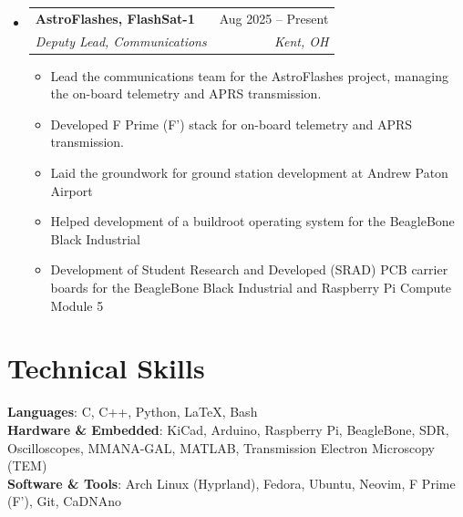 \documentclass[11pt, letterpaper]{article}
\makeatletter
\newcommand{\resumeItem}[1]{\item\small{#1}}
\newcommand{\resumeSubheading}[4]{
  \vspace{-1pt}\item
    \begin{tabular*}{0.97\textwidth}[t]{l@{\extracolsep{\fill}}r}
      \textbf{#1} & #2 \\
      \textit{\small#3} & \textit{\small #4} \\
    \end{tabular*}\vspace{-5pt}
}
\makeatother
\begin{document}
\begin{itemize}[leftmargin=0.15in, label={}]
    \resumeSubheading
        {AstroFlashes, FlashSat-1}{Aug 2025 -- Present}{Deputy Lead, Communications}{Kent, OH}
        \begin{itemize}[leftmargin=0.15in, label={$\bullet$}]
            \resumeItem{Lead the communications team for the AstroFlashes project, managing the on-board telemetry and APRS transmission.}
            \resumeItem{Developed F Prime (F') stack for on-board telemetry and APRS transmission.}
            \resumeItem{Laid the groundwork for ground station development at Andrew Paton Airport}
            \resumeItem{Helped development of a buildroot operating system for the BeagleBone Black Industrial}
            \resumeItem{Development of Student Research and Developed (SRAD) PCB carrier boards for the BeagleBone Black Industrial and Raspberry Pi Compute Module 5}
        \end{itemize}
\end{itemize}

\section{Technical Skills}
\begin{itemize}[leftmargin=0.15in, label={}]
    \small{\item{
     \textbf{Languages}{: C, C++, Python, \LaTeX, Bash} \\
     \textbf{Hardware \& Embedded}{: KiCad, Arduino, Raspberry Pi, BeagleBone, SDR, Oscilloscopes, MMANA-GAL, MATLAB, Transmission Electron Microscopy (TEM)} \\
     \textbf{Software \& Tools}{: Arch Linux (Hyprland), Fedora, Ubuntu, Neovim, F Prime (F'), Git, CaDNAno}
    }}
\end{itemize}
\end{document}
